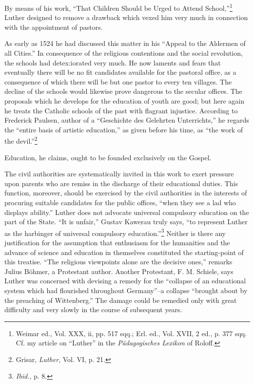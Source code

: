 By means of his work, “That Children Should be Urged to Attend
School,”\footnote{Weimar ed., Vol. XXX, ii, pp. 517 sqq.; Erl. ed., Vol. XVII, 2 ed., p. 377 sqq. Cf. my
article on “Luther” in the \textit{Pädagogisches Lexikon} of Roloff.}
Luther designed to remove a drawback which vexed him
very much in connection with the appointment of pastors.

As early as 1524 he had discussed this matter in his “Appeal to the Aldermen
of all Cities.” In consequence of the religious contentions and the
social revolution, the schools had detex:iorated very much. He now laments
and fears that eventually there will be no fit candidates available for the
pastoral office, as a consequence of which there will be but one pastor to
every ten villages. The decline of the schools would likewise prove dangerous
to the secular offices. The proposals which he develops for the education of
youth are good; but here again he treats the Catholic schools of the past
with flagrant injustice. According to Frederick Paulsen, author of a “Geschichte
des Gelehrten Unterrichts,” he regards the “entire basis of artistic
education,” as given before his time, as “the work of the devil.”\footnote{Grisar, \textit{Luther}, Vol. VI, p. 21.}

Education, he claims, ought to be founded exclusively on the Gospel.

The civil authorities are systematically invited in this work to exert
pressure upon parents who are remiss in the discharge of their educational duties.
This function, moreover, should be exercised by the civil authorities in the
interests of procuring suitable candidates for the public offices, “when they
see a lad who displays ability.” Luther does not advocate universal compulsory
education on the part of the State. “It is unfair,” Gustav Kawerau
truly says, “to represent Luther as the harbinger of universal compulsory
education.”\footnote{\textit{Ibid.}, p. 8.}
Neither is there any justification for the assumption that
enthusiasm for the humanities and the advance of science and education in
themselves constituted the starting-point of this treatise. “The religious
viewpoints alone are the decisive ones,” remarks Julius Böhmer, a Protestant
author. Another Protestant, F. M. Schiele, says Luther was concerned with
devising a remedy for the “collapse of an educational system which had
flourished throughout Germany”--a collapse “brought about by the preaching
of Wittenberg.” The damage could be remedied only with great difficulty
and very slowly in the course of subsequent years.

